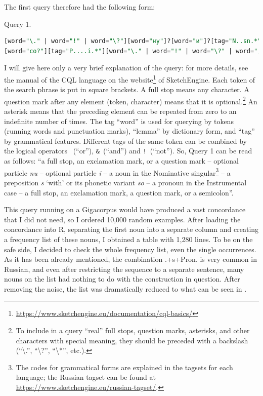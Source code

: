 \documentclass[output=paper]{langscibook}
\begin{document}
The first query therefore had the following form:

\ea
Query 1.
\begin{lstlisting}[language=SQL,breaklines=true]
[word="\." | word="!" | word="\?"][word="ну"]?[word="и"]?[tag="N..sn.*"]
[word="со?"][tag="P....i.*"][word="\." | word="!" | word="\?" | word=";"]
\end{lstlisting}
\z

I will give here only a very brief explanation of the query: for more details, see the manual of the CQL language on the website\footnote{\url{https://www.sketchengine.eu/documentation/cql-basics/}} of SketchEngine. Each token of the search phrase is put in square brackets. A full stop means any character. A question mark after any element (token, character) means that it is optional.\footnote{To include in a query “real” full stops, question marks, asterisks, and other characters with special meaning, they should be preceded with a backslash (“{\textbackslash}.”, “{\textbackslash}?”, “{\textbackslash}*”, etc.).} An asterisk means that the preceding element can be repeated from zero to an indefinite number of times. The tag “word” is used for querying by tokens (running words and punctuation marks), “lemma” by dictionary form, and “tag” by grammatical features. Different tags of the same token can be combined by the logical operators \texttt{\textbar}~(“or”), \texttt{\&}~(“and”) and \texttt{!}~(“not”). So, Query 1 can be read as follows: “a full stop, an exclamation mark, or a question mark – optional particle \textit{nu} – optional particle \textit{i} – a noun in the Nominative singular\footnote{The codes for grammatical forms are explained in the tagsets for each language; the Russian tagset can be found at \url{https://www.sketchengine.eu/russian-tagset/}.} – a preposition \textit{s} ‘with’ or its phonetic variant \textit{so} – a pronoun in the Instrumental case – a full stop, an exclamation mark, a question mark, or a semicolon”.

This query running on a Gigacorpus would have produced a vast concordance that I did not need, so I ordered 10,000 random examples. After loading the concordance into R, separating the first noun into a separate column and creating a frequency list of these nouns, I obtained a table with 1,280 lines. To be on the safe side, I decided to check the whole frequency list, even the single occurrences. As it has been already mentioned, the combination {\glossN}.{\NOM}+s+Pron.{\INSTR} is very common in Russian, and even after restricting the sequence to a separate sentence, many nouns on the list had nothing to do with the construction in question. After removing the noise, the list was dramatically reduced to what can be seen in .
\end{document}
